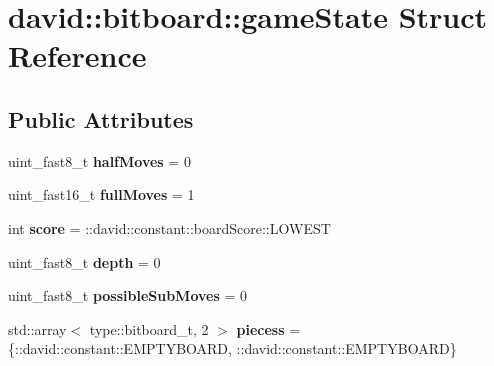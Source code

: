 \hypertarget{structdavid_1_1bitboard_1_1gameState}{}\section{david\+:\+:bitboard\+:\+:game\+State Struct Reference}
\label{structdavid_1_1bitboard_1_1gameState}
\subsection*{Public Attributes}
\begin{DoxyCompactItemize}
\item 
\mbox{\label{structdavid_1_1bitboard_1_1gameState_a1eccb07e0279b314da216c37a6ec5d13}} 
uint\+\_\+fast8\+\_\+t {\bfseries half\+Moves} = 0
\item 
\mbox{\label{structdavid_1_1bitboard_1_1gameState_a61be62d12357e9751e646ab4783faf08}} 
uint\+\_\+fast16\+\_\+t {\bfseries full\+Moves} = 1
\item 
\mbox{\label{structdavid_1_1bitboard_1_1gameState_a21d1606aa14f57a7e52591d084a246d6}} 
int {\bfseries score} = \+::david\+::constant\+::board\+Score\+::\+L\+O\+W\+E\+ST
\item 
\mbox{\label{structdavid_1_1bitboard_1_1gameState_a37cbe5eed807c4b1def70e56e05a7b41}} 
uint\+\_\+fast8\+\_\+t {\bfseries depth} = 0
\item 
\mbox{\label{structdavid_1_1bitboard_1_1gameState_adf55dc4fe955801475f6e2f98c5bd84d}} 
uint\+\_\+fast8\+\_\+t {\bfseries possible\+Sub\+Moves} = 0
\item 
\mbox{\label{structdavid_1_1bitboard_1_1gameState_a49fc12f52d28fe8d08a70c0b4f2804c5}} 
std\+::array$<$ type\+::bitboard\+\_\+t, 2 $>$ {\bfseries piecess} = \{\+::david\+::constant\+::\+E\+M\+P\+T\+Y\+B\+O\+A\+RD, \+::david\+::constant\+::\+E\+M\+P\+T\+Y\+B\+O\+A\+RD\}
\item 
\mbox{\label{structdavid_1_1bitboard_1_1gameState_a9be8fa21e032b27d2e0a6e1a0da1112a}} 

\end{DoxyCompactItemize}
